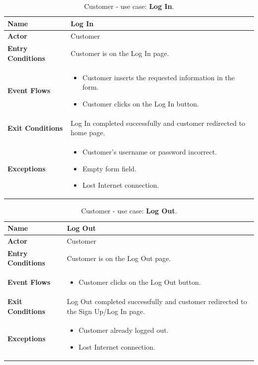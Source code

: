 \begin{table}[h!]
\centering
\begin{tabular}{| m{} | m{} |} 
	\hline
	\textbf{Name} & Log In \\ 
	\hline
	\textbf{Actor} & Customer \\ 
	\hline
	\textbf{Entry Conditions} & Customer is on the Log In page. \\ 
	\hline
	\textbf{Event Flows} &
	\begin{itemize}
	\item Customer inserts the requested information in the form.
	\item Customer clicks on the Log In button.
	\end{itemize} \\ 
	\hline
	\textbf{Exit Conditions} & Log In completed successfully and customer redirected to home page. \\ 
	\hline
	\textbf{Exceptions} &
	\begin{itemize}
	\item Customer's username or password incorrect.
	\item Empty form field.
	\item Lost Internet connection.
	\end{itemize} \\ 
	\hline
\end{tabular}
\caption{Customer - use case: \textbf{Log In}.}
\label{tableLogIn}
\end{table}

\begin{table}[h!]
\centering
\begin{tabular}{| m{} | m{} |} 
	\hline
	\textbf{Name} & Log Out \\ 
	\hline
	\textbf{Actor} & Customer \\ 
	\hline
	\textbf{Entry Conditions} & Customer is on the Log Out page. \\ 
	\hline
	\textbf{Event Flows} &
	\begin{itemize}
	\item Customer clicks on the Log Out button.
	\end{itemize} \\ 
	\hline
	\textbf{Exit Conditions} & Log Out completed successfully and customer redirected to the Sign Up/Log In page. \\ 
	\hline
	\textbf{Exceptions} &
	\begin{itemize}
	\item Customer already logged out.
	\item Lost Internet connection.
	\end{itemize} \\ 
	\hline
\end{tabular}
\caption{Customer - use case: \textbf{Log Out}.}
\label{tableLogIn}
\end{table}

